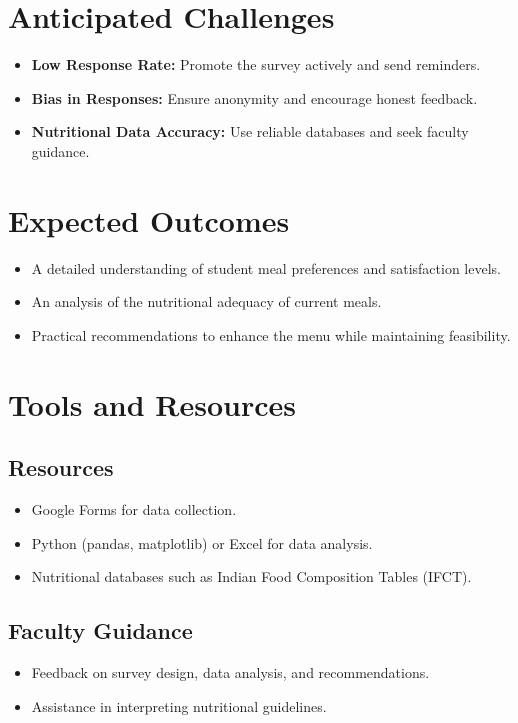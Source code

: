\documentclass[12pt,a4paper]{article}
\begin{document}
\section{Anticipated Challenges}
\begin{itemize}
    \item \textbf{Low Response Rate:} Promote the survey actively and send reminders.
    \item \textbf{Bias in Responses:} Ensure anonymity and encourage honest feedback.
    \item \textbf{Nutritional Data Accuracy:} Use reliable databases and seek faculty guidance.
\end{itemize}

\section{Expected Outcomes}
\begin{itemize}
    \item A detailed understanding of student meal preferences and satisfaction levels.
    \item An analysis of the nutritional adequacy of current meals.
    \item Practical recommendations to enhance the menu while maintaining feasibility.
\end{itemize}

\section{Tools and Resources}
\subsection{Resources}
\begin{itemize}
    \item Google Forms for data collection.
    \item Python (pandas, matplotlib) or Excel for data analysis.
    \item Nutritional databases such as Indian Food Composition Tables (IFCT).
\end{itemize}

\subsection{Faculty Guidance}
\begin{itemize}
    \item Feedback on survey design, data analysis, and recommendations.
    \item Assistance in interpreting nutritional guidelines.
\end{itemize}
\end{document}
